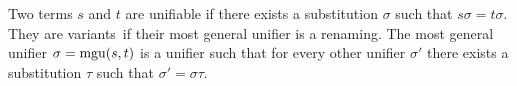 
\begin{definition}\label{def:unifier}
Two terms $s$ and $t$ are {\myem unifiable} if there exists a substitution $\sigma$ such that $s\sigma=t\sigma$.
They are {\myem variants} if their most general unifier is a renaming.
The {\myem most general unifier} $\sigma=\operatorname{mgu}(s,t)$ is a unifier such that
for every other unifier $\sigma'$ there exists a substitution $\tau$ such that
$\sigma' = \sigma \tau$. 
\end{definition}